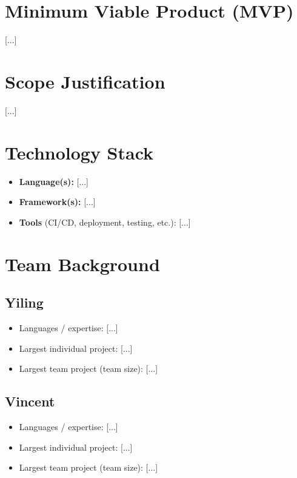 \documentclass[11pt]{article}
\begin{document}
\section{Minimum Viable Product (MVP)}
[...]

\section{Scope Justification}
[...]

\section{Technology Stack}
\begin{itemize}
    \item \textbf{Language(s):} [...]
    \item \textbf{Framework(s):} [...]
    \item \textbf{Tools} (CI/CD, deployment, testing, etc.): [...]
\end{itemize}

\section{Team Background}

\subsection{Yiling}
\begin{itemize}[nosep]
    \item Languages / expertise: [...]
    \item Largest individual project: [...]
    \item Largest team project (team size): [...]
\end{itemize}

\subsection{Vincent}
\begin{itemize}[nosep]
    \item Languages / expertise: [...]
    \item Largest individual project: [...]
    \item Largest team project (team size): [...]
\end{itemize}
\end{document}
